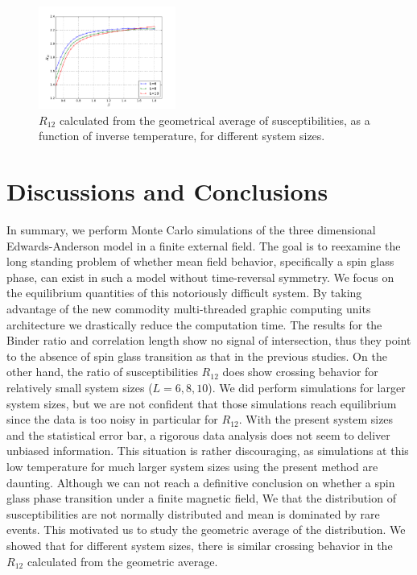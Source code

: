 \documentclass[aps,prb,twocolumn,showpacs,superscriptaddress]{revtex4}
\begin{document}
\begin{figure}[ht]
  \centering
  \includegraphics[width=0.4\textwidth]{img/r12_gmean_h01.pdf}
\caption{\label{fig:r12_gmean} $R_{12}$ calculated from the geometrical average
of susceptibilities, 
as a function of inverse temperature, for different system sizes. 
}
\end{figure}


\section{Discussions and Conclusions}
In summary, we perform Monte Carlo simulations of the three dimensional
Edwards-Anderson model in a finite external field. The goal is to reexamine the long 
standing problem of whether mean field behavior, specifically a spin glass phase, can
exist in such a model without time-reversal symmetry. We focus on the equilibrium quantities
of this notoriously difficult system. By taking advantage of the new commodity multi-threaded 
graphic computing units architecture we drastically reduce the computation time. 
The results for the Binder ratio and correlation length show no signal of intersection, 
thus they point to the absence of spin glass transition
as that in the previous studies. On the other hand, the ratio of susceptibilities 
$R_{12}$ does show crossing behavior for relatively small system sizes ($L=6,8,10$). 
We did perform simulations for larger system sizes, 
but we are not confident that those simulations reach equilibrium since the data is too noisy in particular for $R_{12}$.
With the present system sizes and the statistical error bar, a rigorous data 
analysis does not seem to deliver unbiased information. 
This situation is rather discouraging, as simulations at this low temperature 
for much larger system sizes using the present method are daunting. 
Although we can not reach a definitive conclusion on whether a spin glass phase 
transition under a finite magnetic field,
We that the distribution of susceptibilities are not normally distributed 
and mean is dominated by rare events.
This motivated us to study the geometric average of the distribution. 
We showed that for different system sizes, there is similar crossing behavior 
in the $R_{12}$ calculated from the geometric average. 
\end{document}
